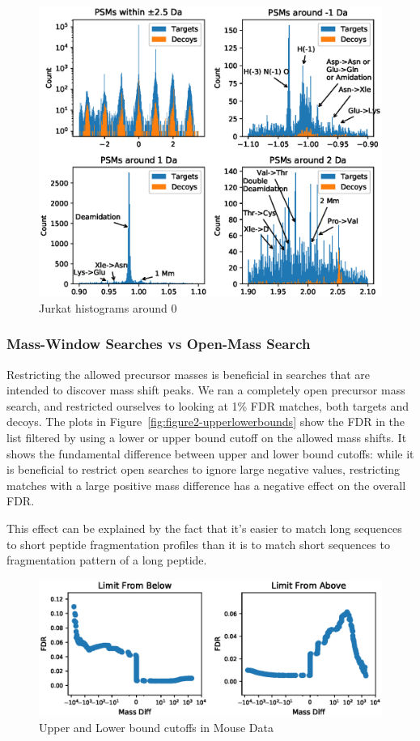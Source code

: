 \documentclass[journal=jprobs,manuscript=article]{achemso}
\begin{document}
\begin{figure}
\caption{Jurkat histograms around 0}
\label{fig:fig3jurkat-1012}
\includegraphics{fig3jurkat-1012}
\end{figure}



\subsubsection{Mass-Window Searches vs Open-Mass Search}

Restricting the allowed precursor masses is beneficial in searches that are intended to discover mass shift peaks.
We ran a completely open precursor mass search, and restricted ourselves to looking at 1\% FDR matches, both targets and decoys.
The plots in Figure~\ref{fig:figure2-upperlowerbounds} show the FDR in the list filtered by using a lower or upper bound cutoff on the allowed mass shifts.
It shows the fundamental difference between upper and lower bound cutoffs: while it is beneficial to restrict open searches to ignore large negative values, restricting matches with a large positive mass difference has a negative effect on the overall FDR.

This effect can be explained by the fact that it's easier to match long sequences to short peptide fragmentation profiles than it is to match short sequences to fragmentation pattern of a long peptide.

\begin{figure}
\caption{Upper and Lower bound cutoffs in Mouse Data}
\label{fig:fig4-limitsOnOpenSearch}
\includegraphics{fig4-limitsOnOpenSearch}
\end{figure}
\end{document}
